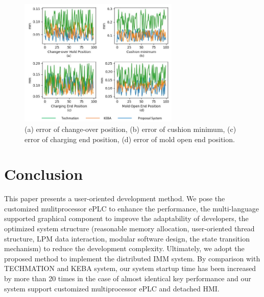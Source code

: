 \documentclass[journal,UTF8]{IEEEtran}
\begin{document}
\begin{figure}
	\centering
	\includegraphics[width=3in]{fig/Compare.pdf}
	\caption{(a) error of change-over position, (b) error of cushion minimum, (c) error of charging end position, (d) error of mold open end position.}
	\label{fig:Compare}
\end{figure}
\section{Conclusion}
\label{conclusion}
This paper presents a user-oriented development method. We pose the customized mulitprocessor ePLC to enhance the performance, the multi-language supported graphical component to improve the adaptability of developers, the optimized system structure (reasonable memory allocation, user-oriented thread structure, LPM data interaction, modular software design, the state transition mechanism) to reduce the development complexity. Ultimately, we adopt the proposed method to implement the distributed IMM system. By comparison with TECHMATION and KEBA system, our system startup time has been increased by more than 20 times in the case of almost identical key performance and our system support customized multiprocessor ePLC and detached HMI.





\ifCLASSOPTIONcaptionsoff
  \newpage
\fi





%
%
%
\end{document}

